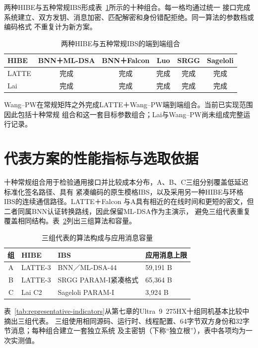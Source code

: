 两种HIBE与五种常规IBS形成表~\ref{tab:implemented-matrix}所示的十种组合。每一格均通过统一
接口完成系统建立、双方发钥、消息加密、匹配解密和身份错配拒绝。同一算法的参数档或编码格式
不重复计为新方案。

\begin{table}[H]
\centering\small
\caption{两种HIBE与五种常规IBS的端到端组合}
\label{tab:implemented-matrix}
\begin{tabular}{@{}lccccc@{}}
\toprule
\rowcolor{black!8} HIBE & BNN＋ML-DSA & BNN＋Falcon & Luo & SRGG & Sageloli \\
\midrule
LATTE & 完成 & 完成 & 完成 & 完成 & 完成 \\
Lai & 完成 & 完成 & 完成 & 完成 & 完成 \\
\bottomrule
\end{tabular}
\end{table}

Wang--PW在常规矩阵之外完成LATTE＋Wang--PW端到端组合。当前已实现范围因此包括十种常规
组合和这一套目标参数组合；Lai与Wang--PW尚未组成完整运行记录。

\section{代表方案的性能指标与选取依据}

十种常规组合用于检验通用接口并比较成本分布，A、B、C三组分别覆盖低延迟标准化签名路径、具有
紧凑编码的原生模格IBS，以及采用另一种HIBE与环格IBS的连续通信路径。LATTE＋Falcon
与A具有相近的在线时间和更短的密文，但二者同属BNN认证转换路线，因此保留ML-DSA作为主演示，
避免三组代表重复覆盖相同结构。表~\ref{tab:representatives}列出三组算法和容量。

\begin{table}[H]
\centering\small
\caption{三组代表的算法构成与应用消息容量}
\label{tab:representatives}
\begin{tabularx}{\textwidth}{@{}cp{}Xp{}@{}}
\toprule
\rowcolor{black!8} 组 & HIBE & IBS & 应用消息上限 \\
\midrule
A & LATTE-3 & BNN／ML-DSA-44 & 59,191 B \\
B & LATTE-3 & SRGG PARAM-I紧凑格式 & 65,364 B \\
C & Lai C2 & Sageloli PARAM-I & 3,924 B \\
\bottomrule
\end{tabularx}
\end{table}

表~\ref{tab:representative-indicators}从第七章的Ultra~9~275HX十组同机基本比较中摘出三组代表。
三组使用相同源码、运行时、线程配置、64字节双方身份和32字节消息；每种组合建立一套独立系统
及主密钥（下称“独立根”），表中各项均为一次实测值。

